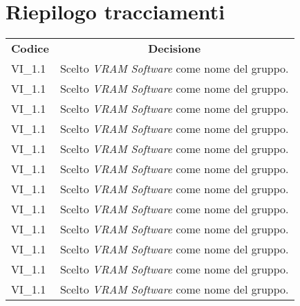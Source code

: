 % 
\setcounter{secnumdepth}{0}
\section{Riepilogo tracciamenti}
\begin{longtable} {
		>{\centering}p{17mm} 
		>{}p{120mm}}
	\rowcolor{gray!50}
	\textbf{Codice} & \multicolumn{1}{c}{\textbf{Decisione}} \\%
	VI\_1.1 & Scelto \textit{VRAM Software} come nome del gruppo. \TBstrut \\ [2mm]
	VI\_1.1 & Scelto \textit{VRAM Software} come nome del gruppo. \TBstrut \\ [2mm]
	VI\_1.1 & Scelto \textit{VRAM Software} come nome del gruppo. \TBstrut \\ [2mm]
	VI\_1.1 & Scelto \textit{VRAM Software} come nome del gruppo. \TBstrut \\ [2mm]
	VI\_1.1 & Scelto \textit{VRAM Software} come nome del gruppo. \TBstrut \\ [2mm]
	VI\_1.1 & Scelto \textit{VRAM Software} come nome del gruppo. \TBstrut \\ [2mm]
	VI\_1.1 & Scelto \textit{VRAM Software} come nome del gruppo. \TBstrut \\ [2mm]
	VI\_1.1 & Scelto \textit{VRAM Software} come nome del gruppo. \TBstrut \\ [2mm]
	VI\_1.1 & Scelto \textit{VRAM Software} come nome del gruppo. \TBstrut \\ [2mm]
	VI\_1.1 & Scelto \textit{VRAM Software} come nome del gruppo. \TBstrut \\ [2mm]
	VI\_1.1 & Scelto \textit{VRAM Software} come nome del gruppo. \TBstrut \\ [2mm]
	VI\_1.1 & Scelto \textit{VRAM Software} come nome del gruppo. \TBstrut \\ [2mm]
\end{longtable}